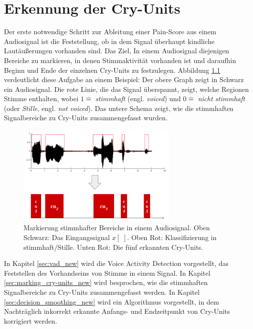 \chapter{Erkennung der Cry-Units}
\label{sec:vad}

Der erste notwendige Schritt zur Ableitung einer Pain-Score aus einem Audiosignal ist die Feststellung, ob in dem Signal überhaupt kindliche Lautäußerungen vorhanden sind. Das Ziel, In einem Audiosignal diejenigen Bereiche zu markieren, in denen Stimmaktivität vorhanden ist und daraufhin Beginn und Ende der einzelnen Cry-Units zu festzulegen. Abbildung  \ref{img:vad01} verdeutlicht diese Aufgabe an einem Beispiel: Der obere Graph zeigt in Schwarz ein Audiosignal. Die rote Linie, die das Signal überspannt, zeigt, welche Regionen Stimme enthalten, wobei $1 \hat{=} $ \emph{stimmhaft} (engl. \emph{voiced}) und $0 \hat{=}  $ \emph{nicht stimmhaft} (oder \emph{Stille}, engl. \emph{not voiced}). Das untere Schema zeigt, wie die stimmhaften Signalbereiche zu Cry-Units zusammengefasst wurden.

\begin{figure}[h]
	\centering
	\includegraphics[width=0.7\textwidth]{bilder/vad_introduction02.png}
	\caption{Markierung stimmhafter Bereiche in einem Audiosignal. Oben Schwarz: Das Eingangssignal $x[\;]$. Oben Rot: Klassifizierung in stimmhaft/Stille. Unten Rot: Die fünf erkannten Cry-Units.}
	\label{img:vad01}
\end{figure}

In Kapitel \ref{sec:vad_new} wird die Voice Activity Detection vorgestellt, das Feststellen des Vorhandseins von Stimme in einem Signal. In Kapitel \ref{sec:marking_cry-units_new} wird besprochen, wie die stimmhaften Signalbereiche zu Cry-Units zusammengefasst werden. In Kapitel \ref{sec:decision_smoothing_new} wird ein Algorithmus vorgestellt, in dem Nachträglich inkorrekt erkannte Anfangs- und Endzeitpunkt von Cry-Units korrigiert werden.

